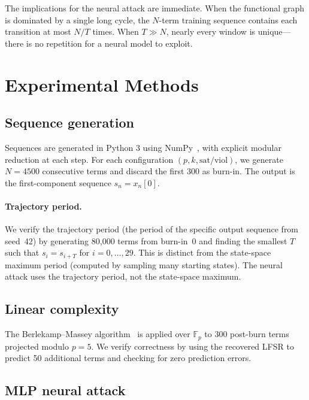 \documentclass[11pt]{article}
\theoremstyle{plain}
\theoremstyle{definition}
\newcommand{\F}{\mathbb{F}}
\begin{document}
The implications for the neural attack are immediate. When the functional graph is dominated by a single long cycle, the $N$-term training sequence contains each transition at most $N/T$ times. When $T \gg N$, nearly every window is unique---there is no repetition for a neural model to exploit.

\section{Experimental Methods}
\label{sec:methods}

\subsection{Sequence generation}

Sequences are generated in Python 3 using NumPy~\citep{numpy}, with explicit modular reduction at each step. For each configuration $(p, k, \mathrm{sat/viol})$, we generate $N = 4500$ consecutive terms and discard the first 300 as burn-in. The output is the first-component sequence $s_n = x_n[0]$.

\paragraph{Trajectory period.} We verify the trajectory period (the period of the specific output sequence from seed~42) by generating 80{,}000 terms from burn-in~0 and finding the smallest $T$ such that $s_i = s_{i+T}$ for $i = 0, \ldots, 29$. This is distinct from the state-space maximum period (computed by sampling many starting states). The neural attack uses the trajectory period, not the state-space maximum.

\subsection{Linear complexity}

The Berlekamp--Massey algorithm~\citep{Massey1969} is applied over $\F_p$ to 300 post-burn terms projected modulo $p=5$. We verify correctness by using the recovered LFSR to predict 50 additional terms and checking for zero prediction errors.

\subsection{MLP neural attack}
\end{document}
